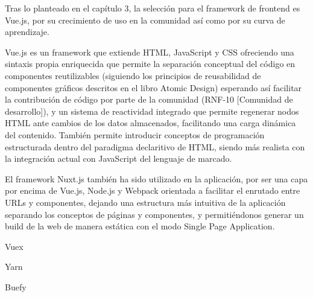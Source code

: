 
Tras lo planteado en el capítulo 3, la selección para el framework de frontend es Vue.js, por su crecimiento de uso en la comunidad así como por su curva de aprendizaje.

Vue.js es un framework que extiende HTML, JavaScript y CSS ofreciendo una sintaxis propia enriquecida que permite la separación conceptual del código en componentes reutilizables (siguiendo los principios de reusabilidad de componentes gráficos descritos en el libro Atomic Design\cite{AtomicDesign}) esperando así facilitar la contribución de código por parte de la comunidad (RNF-10 [Comunidad de desarrollo]),  y un sistema de reactividad integrado que permite regenerar nodos HTML ante cambios de los datos almacenados, facilitando una carga dinámica del contenido. También permite introducir conceptos de programación estructurada dentro del paradigma declaritivo de HTML, siendo más realista con la integración actual con JavaScript del lenguaje de marcado.

El framework Nuxt.js también ha sido utilizado en la aplicación, por ser una capa por encima de Vue.js, Node.js y Webpack orientada a facilitar el enrutado entre URLs y componentes, dejando una estructura más intuitiva de la aplicación separando los conceptos de páginas y componentes, y permitiéndonos generar un build de la web de manera estática con el modo Single Page Application.

Vuex

Yarn

Buefy
